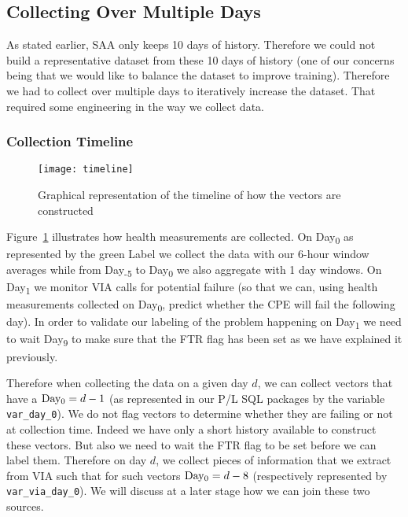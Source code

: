 \subsection{Collecting Over Multiple Days}
\label{subsec:collecting}
As stated earlier, SAA only keeps 10 days of history. Therefore we could not build a representative dataset from these 10 days of history (one of our concerns being that we would like to balance the dataset to improve training). Therefore we had to collect over multiple days to iteratively increase the dataset. That required some engineering in the way we collect data.

\subsubsection{Collection Timeline}

\begin{figure}[ht]
    \begin{center}
    \texttt{[image: timeline]}
    \end{center}
    \caption{Graphical representation of the timeline of how the vectors are constructed}
    \label{timeline}
\end{figure}

Figure~\ref{timeline} illustrates how health measurements are collected. On Day\textsubscript{0} as represented by the green Label we collect the data with our 6-hour window averages while from Day\textsubscript{-5} to Day\textsubscript{0} we also aggregate with 1 day windows. On Day\textsubscript{1} we monitor VIA calls for potential failure (so that we can, using health measurements collected on Day\textsubscript{0}, predict whether the CPE will fail the following day). In order to validate our labeling of the problem happening on Day\textsubscript{1} we need to wait Day\textsubscript{9} to make sure that the FTR flag has been set as we have explained it previously. 

Therefore when collecting the data on a given day $d$, we can collect vectors that have a $\text{Day\textsubscript{0}} = d-1$ (as represented in our P/L SQL packages by the variable \texttt{var\_day\_0}). We do not flag vectors to determine whether they are failing or not at collection time. Indeed we have only a short history available to construct these vectors. But also we need to wait the FTR flag to be set before we can label them. Therefore on day $d$, we collect pieces of information that we extract from VIA such that for such vectors $\text{Day\textsubscript{0}} = d-8$ (respectively represented by \texttt{var\_via\_day\_0}). We will discuss at a later stage how we can join these two sources.


